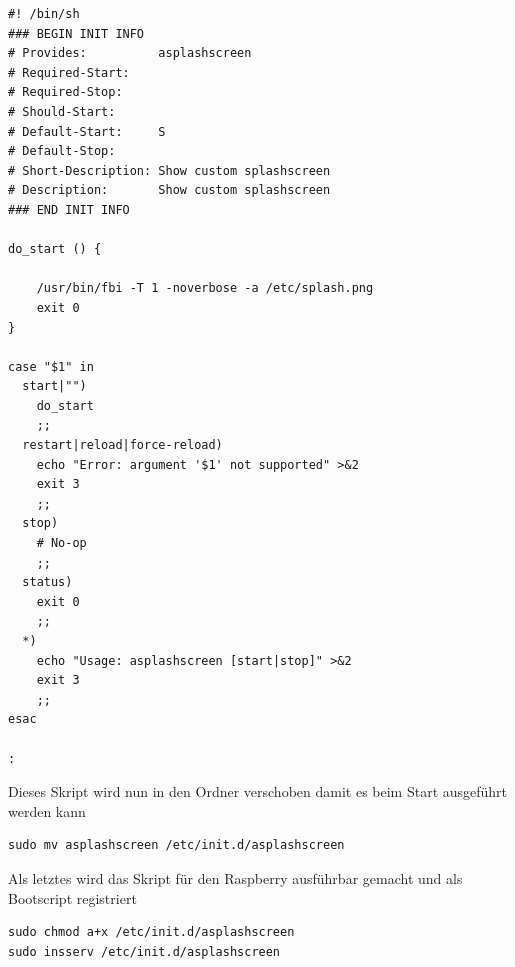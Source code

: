 \documentclass[11pt,a4paper]{article} %
\begin{document}
\begin{frame}

\begin{lstlisting}
#! /bin/sh
### BEGIN INIT INFO
# Provides:          asplashscreen
# Required-Start:
# Required-Stop:
# Should-Start:      
# Default-Start:     S
# Default-Stop:
# Short-Description: Show custom splashscreen
# Description:       Show custom splashscreen
### END INIT INFO
 
do_start () {
 
    /usr/bin/fbi -T 1 -noverbose -a /etc/splash.png    
    exit 0
}
 
case "$1" in
  start|"")
    do_start
    ;;
  restart|reload|force-reload)
    echo "Error: argument '$1' not supported" >&2
    exit 3
    ;;
  stop)
    # No-op
    ;;
  status)
    exit 0
    ;;
  *)
    echo "Usage: asplashscreen [start|stop]" >&2
    exit 3
    ;;
esac
 
:
\end{lstlisting}

\end{frame}

Dieses Skript wird nun in den Ordner verschoben damit es beim Start ausgeführt werden kann
\begin{frame}

\begin{lstlisting}
sudo mv asplashscreen /etc/init.d/asplashscreen
\end{lstlisting}
\end{frame}

Als letztes wird das Skript für den Raspberry ausführbar gemacht und als Bootscript registriert
\begin{frame}

\begin{lstlisting}
sudo chmod a+x /etc/init.d/asplashscreen
sudo insserv /etc/init.d/asplashscreen
\end{lstlisting}
\end{frame}
\end{document}
